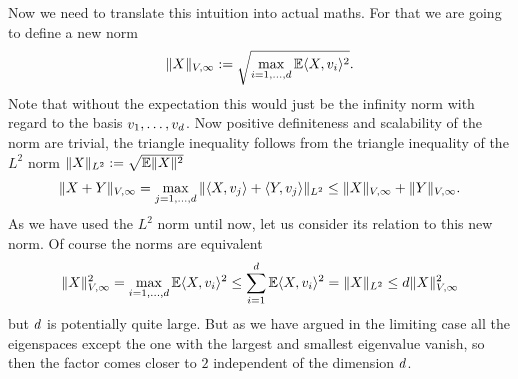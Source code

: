 Now we need to translate this intuition into actual maths. For that we are
going to define a new norm
\begin{align}
	\|X\|_{V,\infty}
	:= \sqrt{\max_{i=1,\dots,d} \mathbb{E}\langle X, v_i\rangle^2}.
\end{align}
Note that without the expectation this would just be the infinity norm with regard
to the basis \(v_1,\dots,v_d\). Now positive definiteness and
scalability of the norm are trivial, the triangle inequality follows from the
triangle inequality of the \(L^2\) norm \(\|X\|_{L^2} := \sqrt{\mathbb{E}\|X\|^2}\)
\begin{align*}
	\|X+Y\|_{V,\infty}
	= \max_{j=1,\dots,d} \|\langle X, v_j\rangle + \langle Y, v_j\rangle\|_{L^2}
	\le \|X\|_{V,\infty} + \|Y\|_{V,\infty}.
\end{align*}
As we have used the \(L^2\) norm until now, let us consider its relation
to this new norm. Of course the norms are equivalent
\begin{align*}
	\|X\|_{V,\infty}^2
	= \max_{i=1,\dots,d} \mathbb{E}\langle X, v_i\rangle^2
	\le \sum_{i=1}^d \mathbb{E}\langle X, v_i\rangle^2
	= \|X\|_{L^2}
	\le d \|X\|_{V,\infty}^2
\end{align*}
but \(d\) is potentially quite large. But as we have argued in the
limiting case all the eigenspaces except the one with the largest and smallest
eigenvalue vanish, so then the factor comes closer to \(2\) independent of the
dimension \(d\).

